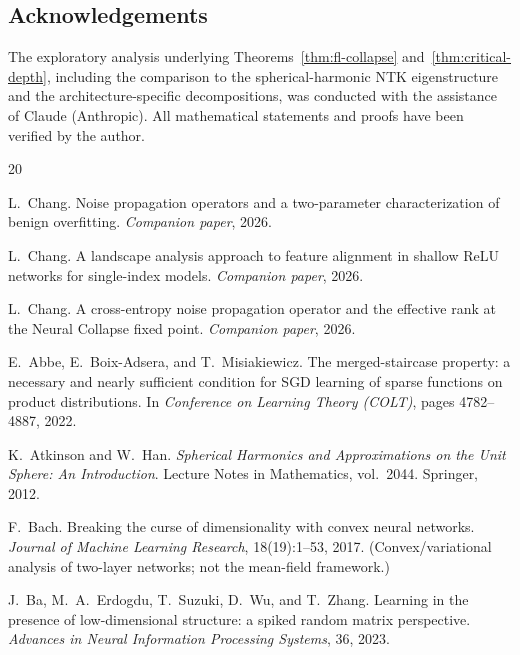 \documentclass[12pt]{amsart}
\theoremstyle{definition}
\theoremstyle{remark}
\begin{document}
\subsection*{Acknowledgements}

The exploratory analysis underlying Theorems~\ref{thm:fl-collapse}
and~\ref{thm:critical-depth}, including the comparison to the
spherical-harmonic NTK eigenstructure and the architecture-specific
decompositions, was conducted with the assistance of Claude (Anthropic).
All mathematical statements and proofs have been verified by the author.


\begin{thebibliography}{20}

L.~Chang.
\newblock Noise propagation operators and a two-parameter characterization
  of benign overfitting.
\newblock \emph{Companion paper}, 2026.

L.~Chang.
\newblock A landscape analysis approach to feature alignment in shallow
  ReLU networks for single-index models.
\newblock \emph{Companion paper}, 2026.

L.~Chang.
\newblock A cross-entropy noise propagation operator and the effective
  rank at the Neural Collapse fixed point.
\newblock \emph{Companion paper}, 2026.

E.~Abbe, E.~Boix-Adsera, and T.~Misiakiewicz.
\newblock The merged-staircase property: a necessary and nearly
  sufficient condition for SGD learning of sparse functions on product
  distributions.
\newblock In \emph{Conference on Learning Theory (COLT)}, pages
  4782--4887, 2022.

K.~Atkinson and W.~Han.
\newblock \emph{Spherical Harmonics and Approximations on the Unit Sphere:
  An Introduction}.
\newblock Lecture Notes in Mathematics, vol.~2044. Springer, 2012.

F.~Bach.
\newblock Breaking the curse of dimensionality with convex neural
  networks.
\newblock \emph{Journal of Machine Learning Research}, 18(19):1--53,
  2017.
\newblock (Convex/variational analysis of two-layer networks; not the
  mean-field framework.)

J.~Ba, M.~A.~Erdogdu, T.~Suzuki, D.~Wu, and T.~Zhang.
\newblock Learning in the presence of low-dimensional structure: a
  spiked random matrix perspective.
\newblock \emph{Advances in Neural Information Processing Systems}, 36,
  2023.


\end{thebibliography}
\end{document}
